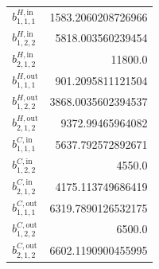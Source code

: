 \documentclass{article}%
\begin{document}
\begin{multicols*}{3}
\begin{supertabular}{lr}
	$b_{1,1,1}^{H,\text{in}}$ & 1583.2060208726966 \\%
	$b_{1,2,2}^{H,\text{in}}$ & 5818.003560239454 \\%
	$b_{2,1,2}^{H,\text{in}}$ & 11800.0 \\%
	$b_{1,1,1}^{H,\text{out}}$ & 901.2095811121504 \\%
	$b_{1,2,2}^{H,\text{out}}$ & 3868.0035602394537 \\%
	$b_{2,1,2}^{H,\text{out}}$ & 9372.99465964082 \\%
	$b_{1,1,1}^{C,\text{in}}$ & 5637.792572892671 \\%
	$b_{1,2,2}^{C,\text{in}}$ & 4550.0 \\%
	$b_{2,1,2}^{C,\text{in}}$ & 4175.113749686419 \\%
	$b_{1,1,1}^{C,\text{out}}$ & 6319.7890126532175 \\%
	$b_{1,2,2}^{C,\text{out}}$ & 6500.0 \\%
	$b_{2,1,2}^{C,\text{out}}$ & 6602.1190900455995 \\%
\end{supertabular}%
\end{multicols*}%
\clearpage%
\end{document}
